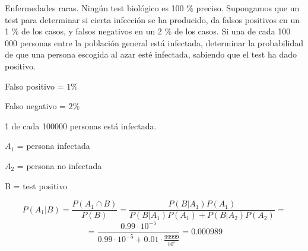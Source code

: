 \begin{problem}[3]Enfermedades raras. Ning\'un test biol\'ogico es 100 $\%$ preciso. Supongamos que un test para
determinar si cierta infecci\'on se ha producido, da falsos positivos en un 1 $\%$ de los casos, y falsos
negativos en un 2 $\%$  de los casos. Si una de cada 100 000 personas entre la poblaci\'on general est\'a
infectada, determinar la probabilidad de que una persona escogida al azar est\'e infectada, sabiendo
que el test ha dado positivo.
\solution

\begin{expla}

Falso positivo = $1\%$

Falso negativo = $2\%$

1 de cada 100000 personas está infectada.
\end{expla}
$A_1$ = persona infectada

$A_2$ = persona no infectada

B = test positivo

\[
P(A_1|B)=\frac{P(A_1\cap B)}{P(B)}=\frac{P(B|A_1)P(A_1)}{P(B|A_1)P(A_1)+P(B|A_2)P(A_2)}=
\]
\[
=\frac{0.99\cdot10^{-5}}{0.99\cdot10^{-5}+0.01\cdot\frac{99999}{10^5}}=0.000989
\]

\end{problem}


